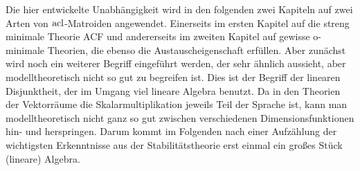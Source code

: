 Die hier entwickelte Unabhängigkeit wird in den folgenden zwei Kapiteln auf zwei Arten von $\operatorname{acl}$-Matroiden angewendet. Einerseits im ersten Kapitel auf die streng minimale Theorie ACF und andererseits im zweiten Kapitel auf gewisse o-minimale Theorien, die ebenso die Austauscheigenschaft erfüllen. Aber zunächst wird noch ein weiterer Begriff eingeführt werden, der sehr ähnlich aussieht, aber modelltheoretisch nicht so gut zu begreifen ist. Dies ist der Begriff der linearen Disjunktheit, der im Umgang viel lineare Algebra benutzt. Da in den Theorien der Vektorräume die Skalarmultiplikation jeweils Teil der Sprache ist, kann man modelltheoretisch nicht ganz so gut zwischen verschiedenen Dimensionsfunktionen hin- und herspringen. Darum kommt im Folgenden nach einer Aufzählung der wichtigsten Erkenntnisse aus der Stabilitätstheorie erst einmal ein großes Stück (lineare) Algebra.